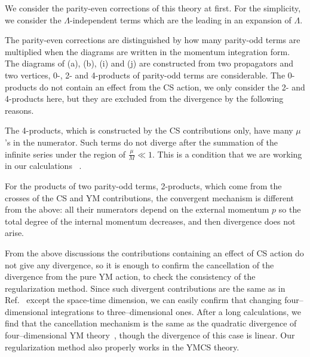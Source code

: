 \documentclass[a4paper,12pt]{article}
\begin{document}

We consider the parity-even corrections of this theory at first.
%
For the simplicity, we consider the $\Lambda$-independent terms
which are the leading
in an expansion of $\Lambda$.

The parity-even corrections are distinguished by
how many parity-odd terms are multiplied
when the diagrams are written in the momentum integration form.
%
The diagrams of (a), (b), (i) and (j) are constructed from
two propagators and two vertices,
0-, 2- and 4-products of parity-odd terms are considerable.
%
The 0-products do not contain an effect from the CS action,
we only consider the 2- and 4-products here,
but they are excluded from the divergence
by the following reasons.

The 4-products, 
which is constructed by the CS contributions only,
have many $\mu$'s in the numerator.
%
Such terms do not diverge after the summation of the infinite series
under the region of $\frac{\mu}{M} \ll 1$.
%
This is a condition that we are working in our calculations%
~\cite{Nittoh:2001full}.

For the products of two parity-odd terms, 2-products,
which come from the crosses of the CS and YM contributions,
the convergent mechanism is different from the above:
%
all their numerators depend on the external momentum $p$
so the total degree of the internal momentum decreases,
and then divergence does not arise.


%
From the above discussions
the contributions containing an effect of CS action
do not give any divergence,
so it is enough to confirm
the cancellation of the divergence from the pure YM action,
to check the consistency of the regularization method.
%
Since such divergent contributions are the same as in Ref.~\cite{Nittoh:2000it}
except the space-time dimension,
we can easily confirm that
changing four--dimensional integrations to three--dimensional ones.
%
After a long calculations, we find that
the cancellation mechanism is the same as the quadratic divergence
of four--dimensional YM theory~\cite{Nittoh:2000it},
though the divergence of this case is linear.
%
Our regularization method also properly works in the YMCS theory.
\end{document}
